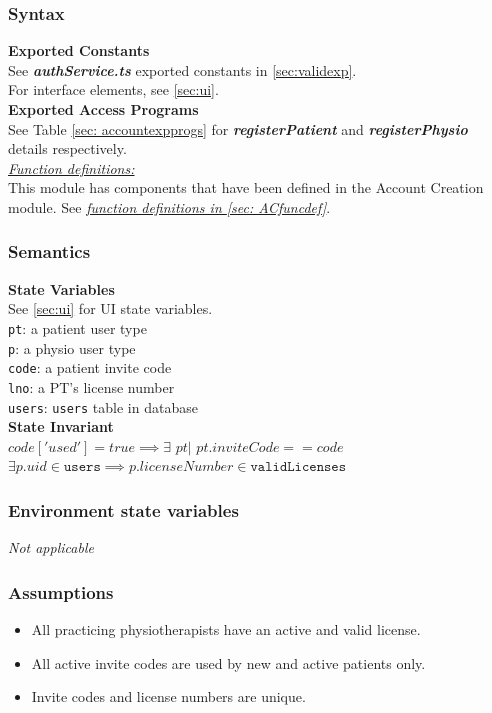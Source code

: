 \documentclass[12pt, titlepage]{article}
\begin{document}
\subsubsection{Syntax}
\textbf{Exported Constants}\\
See \textbf{\textit{authService.ts}} exported constants in \ref{sec:validexp}. \\
For interface elements, see \ref{sec:ui}.\\
\newline
\noindent \textbf{Exported Access Programs} \\
See Table \ref{sec: accountexpprogs} for \textit{\textbf{registerPatient}} and \textit{\textbf{registerPhysio}}
details respectively.\\
\newline
\underline{\textit{Function definitions:}}\\
This module has components that have been defined in the Account Creation module. See \hyperref[sec: ACfuncdef]{\textit{function definitions in \ref*{sec: ACfuncdef}}}.

\subsubsection{Semantics}
\textbf{State Variables}\\
See \ref{sec:ui} for UI state variables. \\
\texttt{pt}: a patient user type\\
\texttt{p}: a physio user type \\
\texttt{code}: a patient invite code \\
\texttt{lno}: a PT's license number \\
\texttt{users}: \texttt{users} table in database\\

\noindent \textbf{State Invariant}\\
$ code['used'] = true \implies \exists$ $pt |$ $pt.inviteCode == code$\\
$ \exists p.uid \in \texttt{users} \implies p.licenseNumber \in \texttt{validLicenses}$ 
\subsubsection{Environment state variables}
\textit{Not applicable}
\subsubsection{Assumptions}
\begin{itemize}
    \item All practicing physiotherapists have an active and valid license.
    \item All active invite codes are used by new and active patients only.
    \item Invite codes and license numbers are unique.
\end{itemize}
\end{document}
